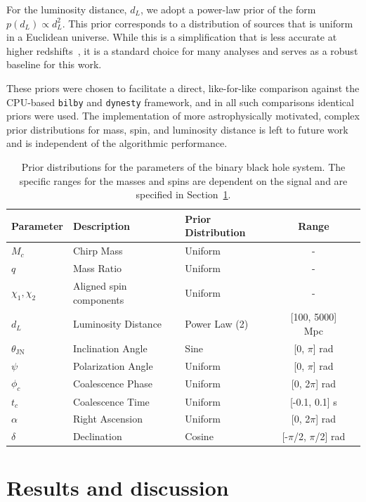 \documentclass[fleqn,usenatbib]{mnras}
\begin{document}
For the luminosity distance, $d_L$, we adopt a power-law prior of the
form $p(d_L) \propto d_L^2$. This prior corresponds to a distribution of
sources that is uniform in a Euclidean universe. While this is a
simplification that is less accurate at higher redshifts~\citep{bilby_validation}, it is a
standard choice for many analyses and serves as a robust baseline for
this work.

These priors were chosen to facilitate a direct, like-for-like
comparison against the CPU-based \texttt{bilby} and \texttt{dynesty}
framework, and in all such comparisons identical priors were used. The
implementation of more astrophysically motivated, complex prior
distributions for mass, spin, and luminosity distance is left to
future work and is independent of the algorithmic performance.

\begin{table}
\setlength{\tabcolsep}{3pt} %
\centering
\caption{Prior distributions for the parameters of the binary black hole
system. The specific ranges for the masses and spins
 are dependent on the signal and are specified in Section~\ref{sec:results}.}
\label{tab:priors}
\begin{tabular}{l l l c c}
\hline
\hline
\textbf{Parameter} & \textbf{Description} & \textbf{Prior Distribution} & \textbf{Range}\\
\hline
$M_c$ & Chirp Mass & Uniform & - \\
$q$ & Mass Ratio & Uniform & - \\
$\chi_1, \chi_2$ & Aligned spin components & Uniform & - \\
$d_L$ & Luminosity Distance & Power Law (2) & [100, 5000] Mpc \\
$\theta_{\textrm{JN}}$ & Inclination Angle & Sine & [0, $\pi$] rad \\
$\psi$ & Polarization Angle & Uniform & [0, $\pi$] rad \\
$\phi_c$ & Coalescence Phase & Uniform & [0, 2$\pi$] rad \\
$t_c$ & Coalescence Time & Uniform & [-0.1, 0.1] s\\
$\alpha$ & Right Ascension & Uniform & [0, 2$\pi$] rad \\
$\delta$ & Declination & Cosine & [-$\pi$/2, $\pi$/2] rad \\
\hline
\hline
\end{tabular}
\end{table}


\section{Results and discussion}
\label{sec:results}
\end{document}
